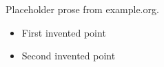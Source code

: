 \documentclass{article}
\begin{document}
Placeholder prose from example.org.

\begin{itemize}
\item First invented point
\item Second invented point
\end{itemize}
\end{document}
